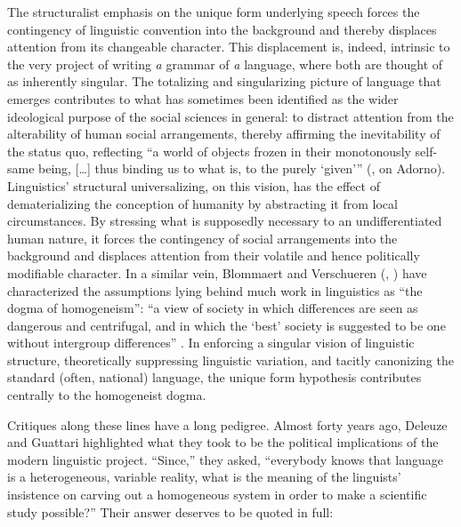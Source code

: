 \documentclass[output=paper]{langscibook}
\begin{document}
The structuralist emphasis on the unique form underlying speech forces the contingency of linguistic convention into the background and thereby displaces attention from its changeable character. This displacement is, indeed, intrinsic to the very project of writing \emph{a} grammar of \emph{a} language, where both are thought of as inherently singular. The totalizing and singularizing picture of language that emerges contributes to what has sometimes been identified as the wider ideological purpose of the social sciences in general: to distract attention from the alterability of human social arrangements, thereby affirming the inevitability of the status quo, reflecting ``a world of objects frozen in their monotonously self-same being, […] thus binding us to what is, to the purely `given''' (\citealt[126]{Eagleton1991}, on Adorno). Linguistics' structural universalizing, on this vision, has the effect of dematerializing the conception of humanity by abstracting it from local circumstances. By stressing what is supposedly necessary to an undifferentiated human nature, it forces the contingency of social arrangements into the background and displaces attention from their volatile and hence politically modifiable character. In a similar vein, Blommaert and Verschueren (\citeyear{BlommaertVerschueren1991}, \citeyear{BlommaertVerschueren1992}) have characterized the assumptions lying behind much work in linguistics as ``the dogma of homogeneism'': ``a view of society in which differences are seen as dangerous and centrifugal, and in which the `best' society is suggested to be one without intergroup differences'' \citep[362]{BlommaertVerschueren1992}. In enforcing a singular vision of linguistic structure, theoretically suppressing linguistic variation, and tacitly canonizing the standard (often, national) language, the unique form hypothesis contributes centrally to the homogeneist dogma.

Critiques along these lines have a long pedigree. Almost forty years ago, Deleuze and Guattari highlighted what they took to be the political implications of the modern linguistic project. ``Since,'' they asked, ``everybody knows that language is a heterogeneous, variable reality, what is the meaning of the linguists' insistence on carving out a homogeneous system in order to make a scientific study possible?'' Their answer deserves to be quoted in full:
\end{document}
